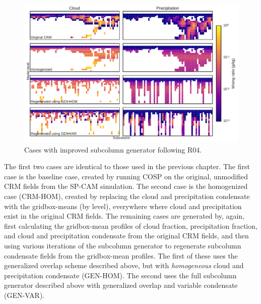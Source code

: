 \begin{figure}
\centering
\includegraphics[width=\columnwidth]{graphics/mxratio_gen-var.pdf}
\caption{Cases with improved subcolumn generator following R04.}
\label{mxratio_gen-var}
\end{figure}

The first two cases are identical to those used in the previous chapter. The first case is the baseline case, created by running COSP on the original, unmodified CRM fields from the SP-CAM simulation. The second case is the homogenized case (CRM-HOM), created by replacing the cloud and precipitation condensate with the gridbox-means (by level), everywhere where cloud and precipitation exist in the original CRM fields. The remaining cases are generated by, again, first calculating the gridbox-mean profiles of cloud fraction, precipitation fraction, and cloud and precipitation condensate from the original CRM fields, and then using various iterations of the subcolumn generator to regenerate subcolumn condensate fields from the gridbox-mean profiles. The first of these uses the generalized overlap scheme described above, but with \emph{homogeneous} cloud and precipitation condensate (GEN-HOM). The second uses the full subcolumn generator described above with generalized overlap and variable condensate (GEN-VAR).

